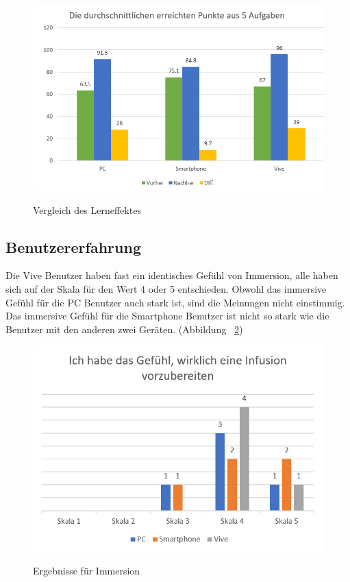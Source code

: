 \begin{figure}[ht]
\vspace*{2.3em}
\centering
\caption{Vergleich des Lerneffektes}
\includegraphics[width= \textwidth]{images/testErgebnisse.png}
\label{fig:testErgebnisse}
\vspace*{1em}
\end{figure}

\subsection{Benutzererfahrung}

Die Vive Benutzer haben fast ein identisches Gefühl von Immersion, alle haben sich auf der Skala für den Wert 4 oder 5 entschieden. Obwohl das immersive Gefühl für die PC Benutzer auch stark ist, sind die Meinungen nicht einstimmig. Das immersive Gefühl für die Smartphone Benutzer ist nicht so stark wie die Benutzer mit den anderen zwei Geräten. (Abbildung ~\ref{fig:gefuehlWirklich})

\begin{figure}[ht]
\vspace*{1em}
\centering
\caption{Ergebnisse für Immersion}
\includegraphics[width= \textwidth]{images/gefuehlWirklich.png}
\label{fig:gefuehlWirklich} 
\end{figure}

